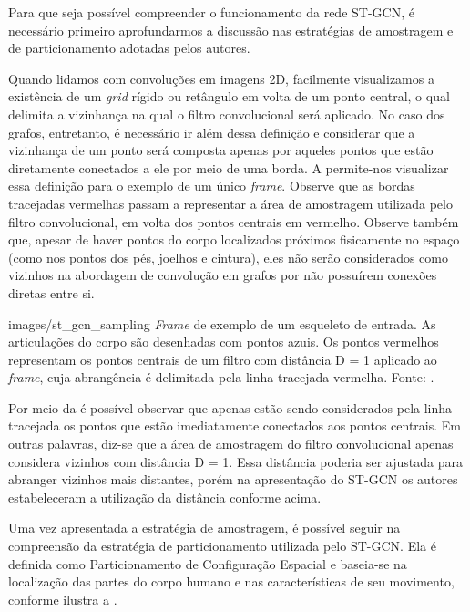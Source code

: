 Para que seja possível compreender o funcionamento da rede ST-GCN, é necessário primeiro aprofundarmos a discussão nas estratégias de amostragem e de particionamento adotadas pelos autores. 

Quando lidamos com convoluções em imagens 2D, facilmente visualizamos a existência de um \textit{grid} rígido ou retângulo em volta de um ponto central, o qual delimita a vizinhança na qual o filtro convolucional será aplicado. No caso dos grafos, entretanto, é necessário ir além dessa definição e considerar que a vizinhança de um ponto será composta apenas por aqueles pontos que estão diretamente conectados a ele por meio de uma borda. A  permite-nos visualizar essa definição para o exemplo de um único \textit{frame}. Observe que as bordas tracejadas vermelhas passam a representar a área de amostragem utilizada pelo filtro convolucional, em volta dos pontos centrais em vermelho. Observe também que, apesar de haver pontos do corpo localizados próximos fisicamente no espaço (como nos pontos dos pés, joelhos e cintura), eles não serão considerados como vizinhos na abordagem de convolução em grafos por não possuírem conexões diretas entre si.

    {images/st_gcn_sampling}
    {\textit{Frame} de exemplo de um esqueleto de entrada. As articulações do corpo são desenhadas com pontos azuis. Os pontos vermelhos representam os pontos centrais de um filtro com distância D = 1 aplicado ao \textit{frame}, cuja abrangência é delimitada pela linha tracejada vermelha. Fonte: \cite[p. 5]{st-gcn-2018}.}

Por meio da  é possível observar que apenas estão sendo considerados pela linha tracejada os pontos que estão imediatamente conectados aos pontos centrais. Em outras palavras, diz-se que a área de amostragem do filtro convolucional apenas considera vizinhos com distância D = 1. Essa distância poderia ser ajustada para abranger vizinhos mais distantes, porém na apresentação do ST-GCN \cite{st-gcn-2018} os autores estabeleceram a utilização da distância conforme acima.

Uma vez apresentada a estratégia de amostragem, é possível seguir na compreensão da estratégia de particionamento utilizada pelo ST-GCN. Ela é definida como Particionamento de Configuração Espacial e baseia-se na localização das partes do corpo humano e nas características de seu movimento, conforme ilustra a .


